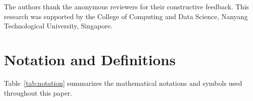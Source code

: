 \documentclass[acmlarge]{acmart}
\begin{document}

\begin{acks}
The authors thank the anonymous reviewers for their constructive feedback. This research was supported by the College of Computing and Data Science, Nanyang Technological University, Singapore.
\end{acks}






\appendix

\section{Notation and Definitions}
\label{sec:appendix_notation}

Table~\ref{tab:notation} summarizes the mathematical notations and symbols used throughout this paper.
\end{document}
